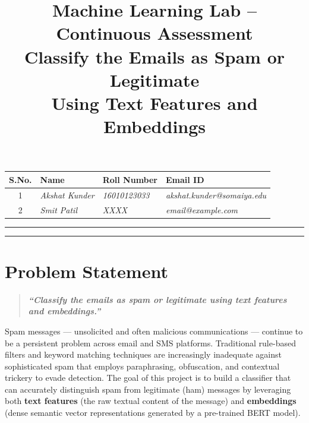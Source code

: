\documentclass[12pt,a4paper]{article}
\title{
    \vspace{-1cm}
    \textbf{\Large Machine Learning Lab -- Continuous Assessment}\\[0.5cm]
    \textbf{\LARGE Classify the Emails as Spam or Legitimate\\Using Text Features and Embeddings}\\[0.3cm]
}
\author{}
\date{}
\begin{document}
\maketitle
\thispagestyle{empty}

\vspace{-0.5cm}
\begin{center}
\renewcommand{\arraystretch}{1.5}
\begin{tabular}{|c|l|l|l|}
\hline
\textbf{S.No.} & \textbf{Name} & \textbf{Roll Number} & \textbf{Email ID} \\
\hline
1 & \textit{Akshat Kunder}         & \textit{16010123033}  & \textit{akshat.kunder@somaiya.edu} \\
\hline
2 & \textit{Smit Patil}     & \textit{XXXX}  & \textit{email@example.com} \\
\hline
\end{tabular}
\end{center}

\vspace{0.5cm}
\hrule
\vspace{0.3cm}
\tableofcontents
\vspace{0.3cm}
\hrule

\newpage

\section{Problem Statement}

\begin{quote}
\textbf{\textit{``Classify the emails as spam or legitimate using text features and embeddings.''}}
\end{quote}

Spam messages --- unsolicited and often malicious communications --- continue to be a persistent problem across email and SMS platforms. Traditional rule-based filters and keyword matching techniques are increasingly inadequate against sophisticated spam that employs paraphrasing, obfuscation, and contextual trickery to evade detection. The goal of this project is to build a classifier that can accurately distinguish spam from legitimate (ham) messages by leveraging both \textbf{text features} (the raw textual content of the message) and \textbf{embeddings} (dense semantic vector representations generated by a pre-trained BERT model).
\end{document}
